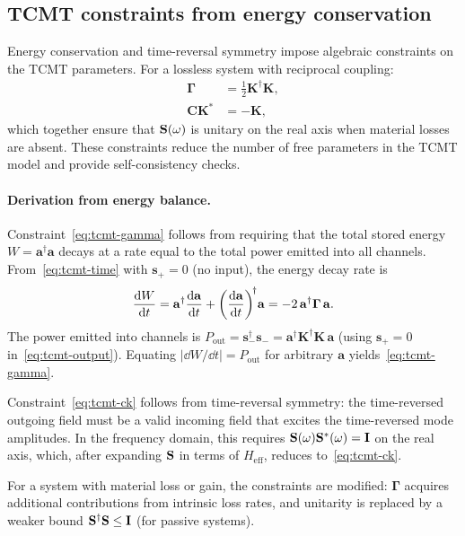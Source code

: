 \subsection{TCMT constraints from energy conservation}
\label{ssec:tcmt-constraints}

Energy conservation and time-reversal symmetry impose algebraic
constraints on the TCMT parameters. For a lossless system with
reciprocal coupling:
\begin{align}
 \boldsymbol{\Gamma} &= \frac{1}{2}\mathbf{K}^\dagger\mathbf{K},
 \label{eq:tcmt-gamma}\\
 \mathbf{C}\mathbf{K}^* &= -\mathbf{K},
 \label{eq:tcmt-ck}
\end{align}
which together ensure that $\mathbf{S}(\omega)$ is unitary on the real axis
when material losses are absent. These constraints reduce the number of
free parameters in the TCMT model and provide self-consistency checks.

\paragraph{Derivation from energy balance.}
Constraint~\eqref{eq:tcmt-gamma} follows from requiring that the total
stored energy $W = \mathbf{a}^\dagger\mathbf{a}$ decays at a rate equal
to the total power emitted into all channels. From~\eqref{eq:tcmt-time}
with $\mathbf{s}_+ = 0$ (no input), the energy decay rate is
\begin{equation}
 \frac{\mathop{}\!\mathrm{d} W}{\mathop{}\!\mathrm{d} t} = \mathbf{a}^\dagger\frac{\mathop{}\!\mathrm{d} \mathbf{a}}{\mathop{}\!\mathrm{d} t}
 + \biggl(\frac{\mathop{}\!\mathrm{d} \mathbf{a}}{\mathop{}\!\mathrm{d} t}\biggr)^{\!\dagger}\mathbf{a}
 = -2\,\mathbf{a}^\dagger\boldsymbol{\Gamma}\,\mathbf{a}.
 \label{eq:energy-decay-rate}
\end{equation}
The power emitted into channels is
$P_{\mathrm{out}} = \mathbf{s}_-^\dagger\mathbf{s}_-
= \mathbf{a}^\dagger\mathbf{K}^\dagger\mathbf{K}\,\mathbf{a}$
(using $\mathbf{s}_+ = 0$ in~\eqref{eq:tcmt-output}).
Equating $|\dd W/\dd t| = P_{\mathrm{out}}$ for arbitrary
$\mathbf{a}$ yields~\eqref{eq:tcmt-gamma}.

Constraint~\eqref{eq:tcmt-ck} follows from time-reversal symmetry:
the time-reversed outgoing field must be a valid incoming field that
excites the time-reversed mode amplitudes. In the frequency domain,
this requires $\mathbf{S}(\omega)\mathbf{S}^*(\omega) = \mathbf{I}$ on the real
axis, which, after expanding $\mathbf{S}$ in terms of
$H_{\mathrm{eff}}$, reduces to~\eqref{eq:tcmt-ck}.

For a system with material loss or gain, the constraints are modified:
$\boldsymbol{\Gamma}$ acquires additional contributions from intrinsic
loss rates, and unitarity is replaced by a weaker bound
$\mathbf{S}^\dagger\mathbf{S} \le \mathbf{I}$ (for passive systems).

